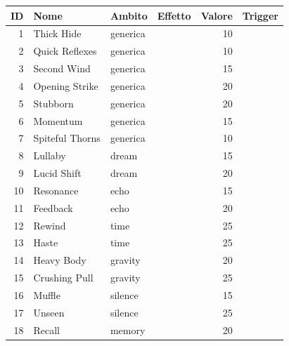 \documentclass[11pt,a4paper]{article}
\begin{document}
\begin{xltabular}{\linewidth}{@{}rL{3.1cm}L{1.9cm}L{3.6cm}rY@{}}
  \toprule
  ID & Nome & Ambito & Effetto & Valore & Trigger \\
  \midrule
    & Thick Hide          & generica &     & 10  &  \\
  2  & Quick Reflexes      & generica &                & 10  &  \\
  3  & Second Wind         & generica &                 & 15  &  \\
  4  & Opening Strike      & generica &         & 20  &  \\
  5  & Stubborn            & generica &     & 20  &  \\
  6  & Momentum            & generica &          & 15  &  \\
  7  & Spiteful Thorns     & generica &              & 10  &  \\
  8  & Lullaby             & dream    &                 & 15  &  \\
  9  & Lucid Shift         & dream    &                & 20  &  \\
  10 & Resonance           & echo     &         & 15  &  \\
  11 & Feedback            & echo     &              & 20  &  \\
  12 & Rewind              & time     &                 & 25  &  \\
  13 & Haste               & time     &          & 25  &  \\
  14 & Heavy Body          & gravity  &     & 20  &  \\
  15 & Crushing Pull       & gravity  &         & 25  &  \\
  16 & Muffle              & silence  &               & 15  &  \\
  17 & Unseen              & silence  &                & 25  &  \\
  18 & Recall              & memory   &         & 20  &  \\

\end{xltabular}
\end{document}
